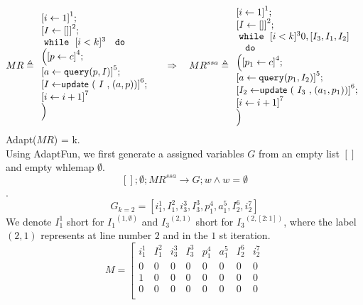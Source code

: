 \documentclass[a4paper,11pt]{article}
\newcommand{\THESYSTEM}{\textsf{AdaptFun}}
\begin{document}
%
\begin{example}
{
\[
MR \triangleq
\begin{array}{l}
    \left[i \leftarrow 1 \right]^1 ; \\
    \left[I \leftarrow [] \right]^2; \\
   \ewhile ~ [i < k]^{3} 
    \ ~ \edo ~ \\ \Big(
    \left[p \leftarrow c \right]^4 ; \\
    \left[a \leftarrow \query(p, I) \right]^5; \\
    \left[I \leftarrow \eupdt( {I}, (a, p))  \right]^6 ; \\
    \left[i \leftarrow i + 1 \right]^7 \\
    \Big) 
\end{array}
%
~~~~ \Rightarrow ~~~
%
MR^{ssa} \triangleq
\begin{array}{l}
    \left[i \leftarrow 1 \right]^1 ; \\
   \left[I \leftarrow [] \right]^2; \\
   \ewhile ~ [i < k]^{3} 0, [I_3,I_1,I_2] \\ 
    \ ~ \edo ~ \\ \Big(
    \left[p_1 \leftarrow c \right]^4 ; \\
    \left[a \leftarrow \query(p_1, I_2) \right]^5; \\
    \left[I_2 \leftarrow \eupdt( {I_3}, (a_1, p_1))  \right]^6;\\
    \left[i \leftarrow i + 1 \right]^7 \\
    \Big) 
\end{array}
\]
}
%
%
%
Adapt($MR$) = k.
\\
%
{
Using \THESYSTEM, we first generate a assigned variables $G$ from an empty list $[]$ and empty whlemap $\emptyset$.
 \[[]; \emptyset; MR^{ssa} \to G; w  \land w = \emptyset\].
 \[
 G_{k=2} = 
 \left[
 i_1^{1}, I_1^2, i_3^3, I_3^3, p_1^4, a_1^5, I_2^6, i_2^7
\right] 
\]
  We denote $I_1^{1}$ short for ${I_1}^{(1,\emptyset)}$ and ${I_3}^{(2,1)}$ short for ${I_3}^{(2,[2:1])}$, where the label $(2, 1)$ represents at line number $2$ and in the $1$ st iteration.
  }
{
	\[
M =  \left[ \begin{matrix}
   i_1^{1} & I_1^2 & i_3^3 & I_3^3 & p_1^4 & a_1^5 & I_2^6 & i_2^7\\
 0 & 0 & 0 & 0 & 0 & 0 & 0 & 0 \\
 1 & 0 & 0 & 0 & 0 & 0 & 0 & 0 \\
 0 & 0 & 0 & 0 & 0 & 0 & 0 & 0 \\

\end{matrix}\]}
\end{example}
\end{document}
